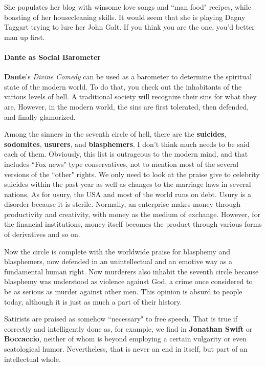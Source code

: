 She populates her blog with winsome love songs and ``man food" recipes, while boasting of her housecleaning skills. It would seem that she is playing Dagny Taggart trying to lure her John Galt. If you think you are the one, you'd better man up first.

\paragraph{Dante as Social Barometer}
\textbf{Dante}'s \emph{Divine Comedy} can be used as a barometer to determine the spiritual state of the modern world. To do that, you check out the inhabitants of the various levels of hell. A traditional society will recognize their sins for what they are. However, in the modern world, the sins are first tolerated, then defended, and finally glamorized.

Among the sinners in the seventh circle of hell, there are the \textbf{suicides}, \textbf{sodomites}, \textbf{usurers}, and \textbf{blasphemers}. I don't think much needs to be said each of them. Obviously, this list is outrageous to the modern mind, and that includes ``Fox news" type conservatives, not to mention most of the several versions of the ``other" rights. We only need to look at the praise give to celebrity suicides within the past year as well as changes to the marriage laws in several nations. As for usury, the USA and most of the world runs on debt. Usury is a disorder because it is sterile. Normally, an enterprise makes money through productivity and creativity, with money as the medium of exchange. However, for the financial institutions, money itself becomes the product through various forms of derivatives and so on.

Now the circle is complete with the worldwide praise for blasphemy and blasphemers, now defended in an unintellectual and an emotive way as a fundamental human right. Now murderers also inhabit the seventh circle because blasphemy was understood as violence against God, a crime once considered to be as serious as murder against other men. This opinion is absurd to people today, although it is just as much a part of their history.

Satirists are praised as somehow ``necessary" to free speech. That is true if correctly and intelligently done as, for example, we find in \textbf{Jonathan Swift} or \textbf{Boccaccio}, neither of whom is beyond employing a certain vulgarity or even scatological humor. Nevertheless, that is never an end in itself, but part of an intellectual whole.


